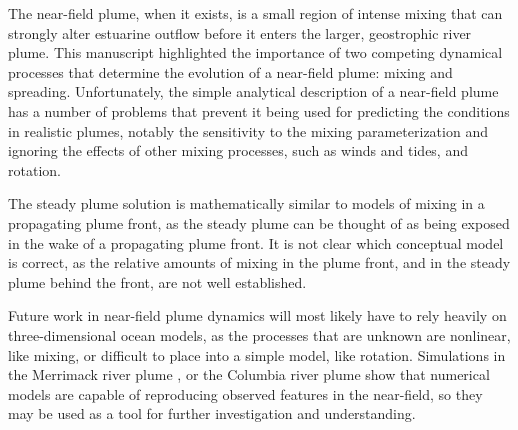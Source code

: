 \documentclass[12pt]{article}
\begin{document}
{The near-field plume, when it exists, is a small region of intense mixing that can strongly alter estuarine outflow before it enters the larger, geostrophic river plume. This manuscript highlighted the importance of two competing dynamical processes that determine the evolution of a near-field plume: mixing and spreading. Unfortunately, the simple analytical description of a near-field plume has a number of problems that prevent it being used for predicting the conditions in realistic plumes, notably the sensitivity to the mixing parameterization and ignoring the effects of other mixing processes, such as winds and tides, and rotation. 

The steady plume solution is mathematically similar to models of mixing in a propagating plume front, as the steady plume can be thought of as being exposed in the wake of a propagating plume front. It is not clear which conceptual model is correct, as the relative amounts of mixing in the plume front, and in the steady plume behind the front, are not well established. 

Future work in near-field plume dynamics will most likely have to rely heavily on three-dimensional ocean models, as the processes that are unknown are nonlinear, like mixing, or difficult to place into a simple model, like rotation. Simulations in the Merrimack river plume \citep{macdonald.ea:07, hetland.macdonald:08}, or the Columbia river plume \citep{maccready.ea:09} show that numerical models are capable of reproducing observed features in the near-field, so they may be used as a tool for further investigation and understanding.









}
\end{document}
